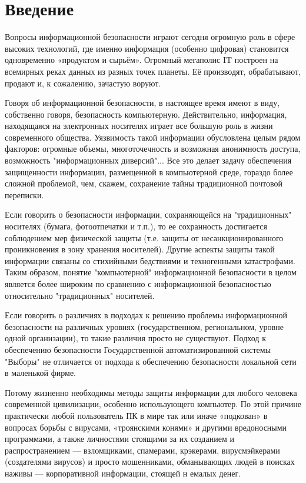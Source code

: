 \chapter*{Введение}

Вопросы информационной безопасности играют сегодня огромную роль в сфере высоких технологий, где именно информация (особенно цифровая) становится одновременно «продуктом и сырьём». Огромный мегаполис IT построен на всемирных реках данных из разных точек планеты. Её  производят, обрабатывают, продают и, к сожалению, зачастую воруют.
 
Говоря об информационной безопасности, в настоящее время имеют в виду, собственно говоря, безопасность компьютерную. Действительно, информация, находящаяся на электронных носителях играет все большую роль в жизни современного общества. Уязвимость такой информации обусловлена целым рядом факторов: огромные объемы, многоточечность и возможная анонимность доступа, возможность "информационных диверсий"... Все это делает задачу обеспечения защищенности информации, размещенной в компьютерной среде, гораздо более сложной проблемой, чем, скажем, сохранение тайны традиционной почтовой переписки.

Если говорить о безопасности информации, сохраняющейся на "традиционных" носителях (бумага, фотоотпечатки и т.п.), то ее сохранность достигается соблюдением мер физической защиты (т.е. защиты от несанкционированного проникновения в зону хранения носителей). Другие аспекты защиты такой информации связаны со стихийными бедствиями и техногенными катастрофами. Таким образом, понятие "компьютерной" информационной безопасности в целом является более широким по сравнению с информационной безопасностью относительно "традиционных" носителей.

Если говорить о различиях в подходах к решению проблемы информационной безопасности на различных уровнях (государственном, региональном, уровне одной организации), то такие различия просто не существуют. Подход к обеспечению безопасности Государственной автоматизированной системы "Выборы" не отличается от подхода к обеспечению безопасности локальной сети в маленькой фирме.

Потому жизненно необходимы методы защиты информации для любого человека современной цивилизации, особенно использующего компьютер. По этой причине практически любой пользователь ПК в мире так или иначе «подкован» в вопросах борьбы с вирусами, «троянскими конями» и другими вредоносными программами, а также личностями стоящими за их созданием и распространением — взломщиками, спамерами, крэкерами, вирусмэйкерами (создателями вирусов) и просто мошенниками, обманывающих людей в поисках наживы — корпоративной информации, стоящей н
емалых денег.

